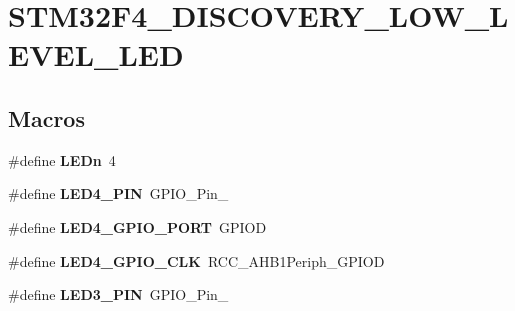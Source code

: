 \hypertarget{group___s_t_m32_f4___d_i_s_c_o_v_e_r_y___l_o_w___l_e_v_e_l___l_e_d}{}\section{S\+T\+M32\+F4\+\_\+\+D\+I\+S\+C\+O\+V\+E\+R\+Y\+\_\+\+L\+O\+W\+\_\+\+L\+E\+V\+E\+L\+\_\+\+L\+E\+D}
\label{group___s_t_m32_f4___d_i_s_c_o_v_e_r_y___l_o_w___l_e_v_e_l___l_e_d}
\subsection*{Macros}
\begin{DoxyCompactItemize}
\item 
\hypertarget{group___s_t_m32_f4___d_i_s_c_o_v_e_r_y___l_o_w___l_e_v_e_l___l_e_d_gab4be2480bf7d44d52aab1190a65a733c}{}\#define {\bfseries L\+E\+Dn}~4\label{group___s_t_m32_f4___d_i_s_c_o_v_e_r_y___l_o_w___l_e_v_e_l___l_e_d_gab4be2480bf7d44d52aab1190a65a733c}

\item 
\hypertarget{group___s_t_m32_f4___d_i_s_c_o_v_e_r_y___l_o_w___l_e_v_e_l___l_e_d_gaae684bb3d2f940637ccbc2adeb0e134d}{}\#define {\bfseries L\+E\+D4\+\_\+\+P\+I\+N}~G\+P\+I\+O\+\_\+\+Pin\+\_\label{group___s_t_m32_f4___d_i_s_c_o_v_e_r_y___l_o_w___l_e_v_e_l___l_e_d_gaae684bb3d2f940637ccbc2adeb0e134d}

\item 
\hypertarget{group___s_t_m32_f4___d_i_s_c_o_v_e_r_y___l_o_w___l_e_v_e_l___l_e_d_ga6b6f3eb4d23b770de265803afbc2b61b}{}\#define {\bfseries L\+E\+D4\+\_\+\+G\+P\+I\+O\+\_\+\+P\+O\+R\+T}~G\+P\+I\+O\+D\label{group___s_t_m32_f4___d_i_s_c_o_v_e_r_y___l_o_w___l_e_v_e_l___l_e_d_ga6b6f3eb4d23b770de265803afbc2b61b}

\item 
\hypertarget{group___s_t_m32_f4___d_i_s_c_o_v_e_r_y___l_o_w___l_e_v_e_l___l_e_d_gaa9cb3506e5b243b35d234bbdbe7fbab3}{}\#define {\bfseries L\+E\+D4\+\_\+\+G\+P\+I\+O\+\_\+\+C\+L\+K}~R\+C\+C\+\_\+\+A\+H\+B1\+Periph\+\_\+\+G\+P\+I\+O\+D\label{group___s_t_m32_f4___d_i_s_c_o_v_e_r_y___l_o_w___l_e_v_e_l___l_e_d_gaa9cb3506e5b243b35d234bbdbe7fbab3}

\item 
\hypertarget{group___s_t_m32_f4___d_i_s_c_o_v_e_r_y___l_o_w___l_e_v_e_l___l_e_d_ga4cb3ff938bcabb01494ce529ae55a542}{}\#define {\bfseries L\+E\+D3\+\_\+\+P\+I\+N}~G\+P\+I\+O\+\_\+\+Pin\+\_\label{group___s_t_m32_f4___d_i_s_c_o_v_e_r_y___l_o_w___l_e_v_e_l___l_e_d_ga4cb3ff938bcabb01494ce529ae55a542}


\end{DoxyCompactItemize}
